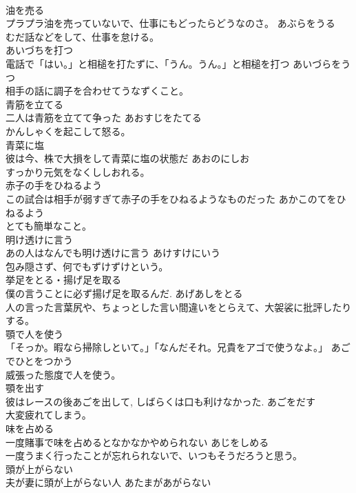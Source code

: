 \documentclass[8pt]{extreport}
\begin{document}
\begin{CJK}{UTF8}{min}
\\	油を売る	
\\	プラプラ油を売っていないで、仕事にもどったらどうなのさ。	あぶらをうる	
\\	むだ話などをして、仕事を怠ける。
\\	あいづちを打つ	
\\	電話で「はい。」と相槌を打たずに、「うん。うん。」と相槌を打つ	あいづらをうつ		
\\	相手の話に調子を合わせてうなずくこと。
\\	青筋を立てる	
\\	二人は青筋を立てて争った	あおすじをたてる	
\\	かんしゃくを起こして怒る。
\\	青菜に塩	
\\	彼は今、株で大損をして青菜に塩の状態だ	あおのにしお	
\\	すっかり元気をなくししおれる。
\\	赤子の手をひねるよう	
\\	この試合は相手が弱すぎて赤子の手をひねるようなものだった	あかこのてをひねるよう	
\\	とても簡単なこと。
\\	明け透けに言う	
\\	あの人はなんでも明け透けに言う	あけすけにいう		
\\	包み隠さず、何でもずけずけという。
\\	挙足をとる・揚げ足を取る	
\\	僕の言うことに必ず揚げ足を取るんだ.	あげあしをとる		
\\	人の言った言葉尻や、ちょっとした言い間違いをとらえて、大袈裟に批評したりする。
\\	顎で人を使う	
\\	「そっか。暇なら掃除しといて。」「なんだそれ。兄貴をアゴで使うなよ。」	あごでひとをつかう	
\\	威張った態度で人を使う。
\\	顎を出す	
\\	彼はレースの後あごを出して, しばらくは口も利けなかった.	あごをだす	
\\	大変疲れてしまう。
\\	味を占める	
\\	一度賭事で味を占めるとなかなかやめられない	あじをしめる	
\\	一度うまく行ったことが忘れられないで、いつもそうだろうと思う。
\\	頭が上がらない	
\\	夫が妻に頭が上がらない人	あたまがあがらない		

\end{CJK}
\end{document}
